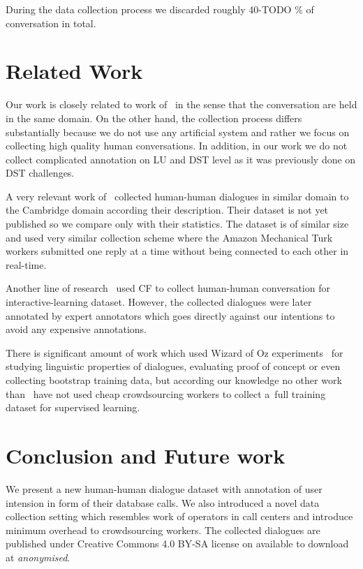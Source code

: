 \documentclass[runningheads,a4paper]{llncs}
\begin{document}
During the data collection process we discarded roughly 40-TODO \% of conversation in total.


\section{Related Work}
\label{sec:related}

Our work is closely related  to work of~\cite{williams2013dstc1, henderson2014dstc2, henderson2014dstc3} in the sense that the conversation are held in the same domain.
On the other hand, the collection process differs substantially because we do not use any artificial system and rather we focus on collecting high quality human conversations. In addition, in our work we do not collect complicated annotation on LU and DST level as it was previously done on DST challenges.

A very relevant work of~\cite{wen2016network} collected human-human dialogues in similar domain to the Cambridge domain according their description.
Their dataset is not yet published so we compare only with their statistics.
The dataset is of similar size and used very similar collection scheme where the Amazon Mechanical Turk workers submitted one reply at a time without being connected to each other in real-time.

Another line of research~\cite{vodolan2016data} used CF to collect human-human conversation for interactive-learning dataset.
However, the collected dialogues were later annotated by expert annotators which goes directly against our intentions to avoid any expensive annotations.

There is significant amount of work which used Wizard of Oz experiments~\cite{whittaker2002fish,walker1997evaluating,rieser2008learning} for studying linguistic properties of dialogues, evaluating proof of concept or even collecting bootstrap training data, but according our knowledge no other work than~\cite{We} have not used cheap crowdsourcing workers to collect a~full training dataset for supervised learning.

\section{Conclusion and Future work}
\label{sec:conc}
We present a new human-human dialogue dataset with annotation of user intension in form of their database calls.
We also introduced a novel data collection setting which resembles work of operators in call centers and introduce minimum overhead to crowdsourcing workers.
The collected dialogues are published under Creative Commons 4.0 BY-SA license on available to download at {\it anonymised}.  %
\end{document}
